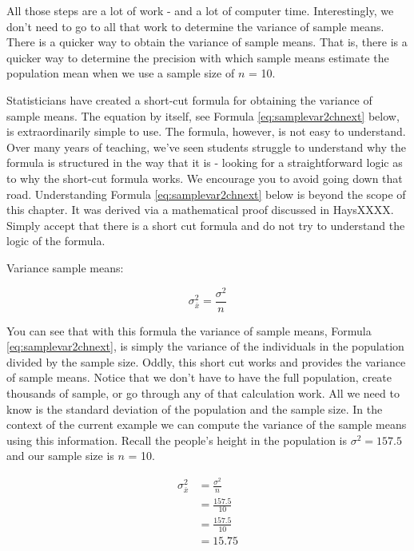 \documentclass[
]{krantz}
\begin{document}
All those steps are a lot of work - and a lot of computer time. Interestingly, we don't need to go to all that work to determine the variance of sample means. There is a quicker way to obtain the variance of sample means. That is, there is a quicker way to determine the precision with which sample means estimate the population mean when we use a sample size of \(n\) = 10.

Statisticians have created a short-cut formula for obtaining the variance of sample means. The equation by itself, see Formula \eqref{eq:samplevar2chnext} below, is extraordinarily simple to use. The formula, however, is not easy to understand. Over many years of teaching, we've seen students struggle to understand why the formula is structured in the way that it is - looking for a straightforward logic as to why the short-cut formula works. We encourage you to avoid going down that road. Understanding Formula \eqref{eq:samplevar2chnext} below is beyond the scope of this chapter. It was derived via a mathematical proof discussed in HaysXXXX. Simply accept that there is a short cut formula and do not try to understand the logic of the formula.

Variance sample means:

\begin{equation} 
\sigma_{\bar{x}}^2 = \frac{\sigma^2}{n}
      \label{eq:samplevar2chnext}
\end{equation}

You can see that with this formula the variance of sample means, Formula \eqref{eq:samplevar2chnext}, is simply the variance of the individuals in the population divided by the sample size. Oddly, this short cut works and provides the variance of sample means. Notice that we don't have to have the full population, create thousands of sample, or go through any of that calculation work. All we need to know is the standard deviation of the population and the sample size. In the context of the current example we can compute the variance of the sample means using this information. Recall the people's height in the population is \(\sigma^2=157.5\) and our sample size is \(n\) = 10.

\[
\begin{aligned} 
\sigma_{\bar{x}}^2 &= \frac{\sigma^2}{n} \\
&= \frac{157.5}{10}\\
&= \frac{157.5}{10}\\
&= 15.75
\end{aligned} 
\]
\end{document}
